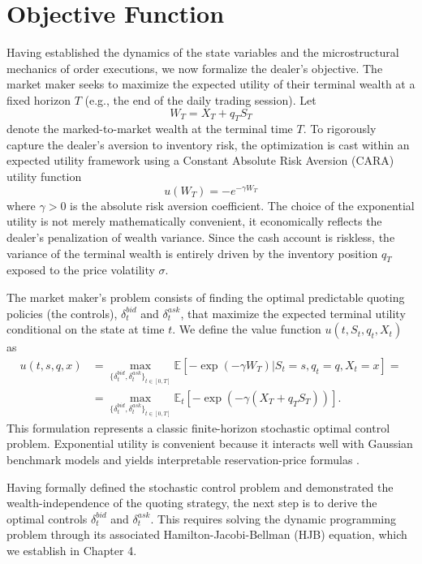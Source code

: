 \documentclass[a4paper,10pt,titlepage,oneside,openany]{book}
\theoremstyle{plain}\newtheorem{theorem}{Theorem}[chapter]
\theoremstyle{definition}\newtheorem{definition}{Definition}[chapter]
\theoremstyle{remark}\newtheorem{remark}{Remark}[chapter]
\begin{document}
\section{Objective Function}
Having established the dynamics of the state variables and the microstructural mechanics of order executions, we now formalize the dealer's objective. The market maker seeks to maximize the expected utility of their terminal wealth at a fixed horizon $T$ (e.g., the end of the daily trading session). Let 
\[
W_T = X_T + q_TS_T
\]
denote the marked-to-market wealth at the terminal time $T$. To rigorously capture the dealer's aversion to inventory risk, the optimization is cast within an expected utility framework using a Constant Absolute Risk Aversion (CARA) utility function
\[
u(W_T) = -e^{-\gamma W_T} 
\]
where $\gamma>0$ is the absolute risk aversion coefficient. The choice of the exponential utility is not merely mathematically convenient, it economically reflects the dealer's penalization of wealth variance. Since the cash account is riskless, the variance of the terminal wealth is entirely driven by the inventory position $q_T$ exposed to the price volatility $\sigma$.

The market maker's problem consists of finding the optimal predictable quoting policies (the controls), $\delta_t^{bid}$ and $\delta_t^{ask}$, that maximize the expected terminal utility conditional on the state at time $t$. We define the value function $u(t,S_t ,q_t, X_t)$ as
\begin{align*}
    u(t,s,q,x)&=\max_{\{\delta_t^{bid},\delta_t^{ask}\}_{t\in[0,T]}} \mathbb{E}\left[-\exp\!\left(-\gamma W_T\right)|S_t=s,q_t=q,X_t=x\right]=\\
    &=\max_{\{\delta_t^{bid},\delta_t^{ask}\}_{t\in[0,T]}} \mathbb{E}_t\left[-\exp\!\left(-\gamma (X_T+q_TS_T)\right)\right].
\end{align*}
This formulation represents a classic finite-horizon stochastic optimal control problem. Exponential utility is convenient because it interacts well with Gaussian benchmark models and yields interpretable reservation-price formulas \cite{AvellanedaStoikov2008,GueantLehalleFernandezTapia2013}.

Having formally defined the stochastic control problem and demonstrated the wealth-independence of the quoting strategy, the next step is to derive the optimal controls $\delta_t^{bid}$ and $\delta_t^{ask}$. This requires solving the dynamic programming problem through its associated Hamilton-Jacobi-Bellman (HJB) equation, which we establish in Chapter 4.
\end{document}
